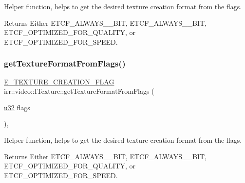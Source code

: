 Helper function, helps to get the desired texture creation format from the flags. 

\begin{DoxyReturn}{Returns}
Either E\+T\+C\+F\+\_\+\+A\+L\+W\+A\+Y\+S\+\_\+\_\+\+B\+IT, E\+T\+C\+F\+\_\+\+A\+L\+W\+A\+Y\+S\+\_\+\_\+\+B\+IT, E\+T\+C\+F\+\_\+\+O\+P\+T\+I\+M\+I\+Z\+E\+D\+\_\+\+F\+O\+R\+\_\+\+Q\+U\+A\+L\+I\+TY, or E\+T\+C\+F\+\_\+\+O\+P\+T\+I\+M\+I\+Z\+E\+D\+\_\+\+F\+O\+R\+\_\+\+S\+P\+E\+ED. 
\end{DoxyReturn}
\mbox{\label{classirr_1_1video_1_1ITexture_afff3160f6aa5f749365ae4f776a440f3}} 
\subsubsection{\texorpdfstring{get\+Texture\+Format\+From\+Flags()}{getTextureFormatFromFlags()}\hspace{0.1cm}{\footnotesize\ttfamily [2/2]}}
{\footnotesize\ttfamily \hyperlink{namespaceirr_1_1video_acaf6f7414534f7d62bff18c5bf11876f}{E\+\_\+\+T\+E\+X\+T\+U\+R\+E\+\_\+\+C\+R\+E\+A\+T\+I\+O\+N\+\_\+\+F\+L\+AG} irr\+::video\+::\+I\+Texture\+::get\+Texture\+Format\+From\+Flags (\begin{DoxyParamCaption}\item[{\hyperlink{namespaceirr_a0416a53257075833e7002efd0a18e804}{u32}}]{flags }\end{DoxyParamCaption})\hspace{0.3cm}{\ttfamily [inline]}, {\ttfamily [protected]}}



Helper function, helps to get the desired texture creation format from the flags. 

\begin{DoxyReturn}{Returns}
Either E\+T\+C\+F\+\_\+\+A\+L\+W\+A\+Y\+S\+\_\+\_\+\+B\+IT, E\+T\+C\+F\+\_\+\+A\+L\+W\+A\+Y\+S\+\_\+\_\+\+B\+IT, E\+T\+C\+F\+\_\+\+O\+P\+T\+I\+M\+I\+Z\+E\+D\+\_\+\+F\+O\+R\+\_\+\+Q\+U\+A\+L\+I\+TY, or E\+T\+C\+F\+\_\+\+O\+P\+T\+I\+M\+I\+Z\+E\+D\+\_\+\+F\+O\+R\+\_\+\+S\+P\+E\+ED. 
\end{DoxyReturn}
\mbox{\label{classirr_1_1video_1_1ITexture_a9da815ed3b2a3efec45f957c6918fbba}} 
